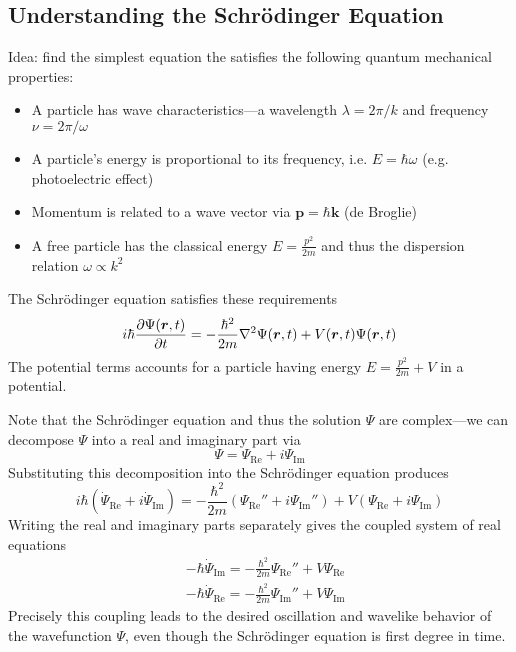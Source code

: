 \documentclass[11pt, a4paper]{article}
\renewcommand{\laplacian}{\nabla^{2}}
\newcommand{\Schro}{Schr\"{o}dinger\xspace}
\renewcommand{\vec}[1]{\bm{#1}}  %
\renewcommand{\r}{\vec{r}}  %
\renewcommand{\P}{\Psi}  %
\begin{document}
\subsection{Understanding the \Schro Equation} 
Idea: find the simplest equation the satisfies the following quantum mechanical properties:
\begin{itemize}
	\item A particle has wave characteristics---a wavelength $ \lambda = 2\pi/k $ and frequency $ \nu = 2\pi/\omega $
	
	\item A particle's energy is proportional to its frequency, i.e. $ E = \hbar \omega $ (e.g. photoelectric effect)
	
	\item Momentum is related to a wave vector via $ \vec{p} = \hbar \vec{k} $ (de Broglie)
	
	\item A free particle has the classical energy $ E = \frac{p^{2}}{2m} $ and thus the dispersion relation $ \omega \propto k^{2} $
\end{itemize}
The \Schro equation satisfies these requirements
\begin{equation*}
	i \hbar \pdv{\Psi(\r, t)}{t} = - \frac{\hbar^{2}}{2m}\laplacian \P(\r, t) + V(\r, t)\Psi(\r, t)
\end{equation*}
The potential terms accounts for a particle having energy $ E = \frac{p^{2}}{2m} + V $ in a potential. 

Note that the \Schro equation and thus the solution $ \P $ are complex---we can decompose $ \P $ into a real and imaginary part via
\begin{equation*}
	\P = \P_{\text{Re}} + i \P_{\text{Im}}
\end{equation*}
Substituting this decomposition into the \Schro equation produces
\begin{equation*}
	i \hbar (\dot{\P}_{\text{Re}} + i \dot{\P}_{\text{Im}})  = - \frac{\hbar^{2}}{2m} (\P_{\text{Re}}'' + i \P_{\text{Im}}'') + V(\P_{\text{Re}} + i \P_{\text{Im}})
\end{equation*}
Writing the real and imaginary parts separately gives the coupled system of real equations
\begin{align*}
	&- \hbar \dot{\P}_{\text{Im}} = - \frac{\hbar^{2}}{2m}\Psi_{\text{Re}}'' + V \P_{\text{Re}}\\
	& - \hbar \dot{\P}_{\text{Re}} = - \frac{\hbar^{2}}{2m}\Psi_{\text{Im}}'' + V \P_{\text{Im}}
\end{align*}
Precisely this coupling leads to the desired oscillation and wavelike behavior of the wavefunction $ \P $, even though the \Schro equation is first degree in time.
\end{document}
